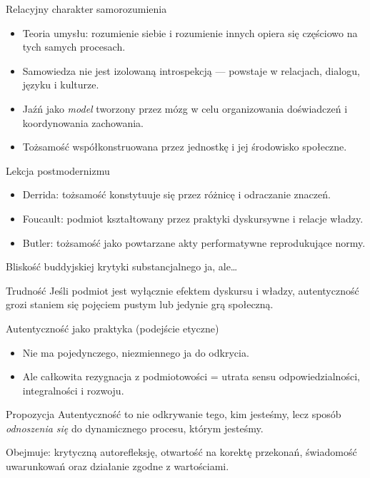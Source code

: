 \documentclass{beamer}
\begin{document}
\begin{frame}{Relacyjny charakter samorozumienia}
  \begin{itemize}
    \item Teoria umysłu: rozumienie siebie i rozumienie innych opiera się
          częściowo na tych samych procesach.
    \item Samowiedza nie jest izolowaną introspekcją --- powstaje w relacjach,
          dialogu, języku i kulturze.
    \item Jaźń jako \emph{model} tworzony przez mózg w celu organizowania
          doświadczeń i koordynowania zachowania.
    \item Tożsamość współkonstruowana przez jednostkę i jej środowisko społeczne.
  \end{itemize}
\end{frame}
 
\begin{frame}{Lekcja postmodernizmu}
  \begin{itemize}
    \item Derrida: tożsamość konstytuuje się przez różnicę i odraczanie znaczeń.
    \item Foucault: podmiot kształtowany przez praktyki dyskursywne
          i relacje władzy.
    \item Butler: tożsamość jako powtarzane akty performatywne reprodukujące normy.
  \end{itemize}
  \vspace{0.5em}
  Bliskość buddyjskiej krytyki substancjalnego ja, ale\ldots
  \begin{block}{Trudność}
    Jeśli podmiot jest wyłącznie efektem dyskursu i władzy, autentyczność
    grozi staniem się pojęciem pustym lub jedynie grą społeczną.
  \end{block}
\end{frame}
 
 
\begin{frame}{Autentyczność jako praktyka (podejście etyczne)}
  \begin{itemize}
    \item Nie ma pojedynczego, niezmiennego ja do odkrycia.
    \item Ale całkowita rezygnacja z podmiotowości = utrata sensu
          odpowiedzialności, integralności i rozwoju.
  \end{itemize}
  \vspace{0.5em}
  \begin{block}{Propozycja}
    Autentyczność to nie odkrywanie tego, kim jesteśmy, lecz sposób
    \emph{odnoszenia się} do dynamicznego procesu, którym jesteśmy.
  \end{block}
  \vspace{0.3em}
  Obejmuje: krytyczną autorefleksję, otwartość na korektę przekonań,
  świadomość uwarunkowań oraz działanie zgodne z wartościami.
\end{frame}
 
\end{document}

